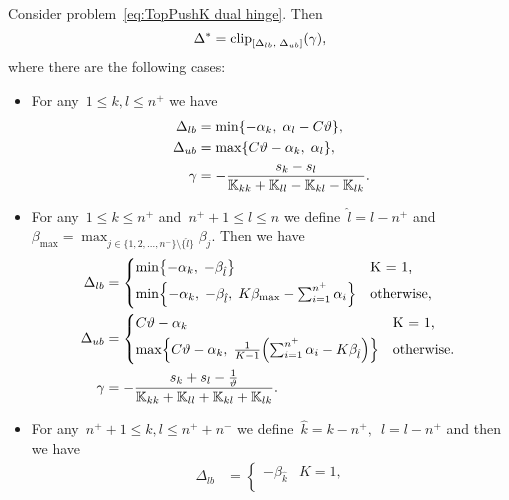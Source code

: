 \begin{theorem}\label{thm:Update rule TopPushK with hinge loss}
  Consider problem~\eqref{eq:TopPushK dual hinge}. Then
  \begin{equation*}
    \Delta^{*} = \clip{\Delta_{lb}}{\Delta_{ub}}{\gamma},
  \end{equation*}
  where there are the following cases:
  \begin{itemize}
    \item For any~$1\le k, l \le n^+$ we have
    \begin{align*}
      \Delta_{lb} & = \min\{- \alpha_k,\; \alpha_l - C \vartheta \}, \\
      \Delta_{ub} & = \max\{C \vartheta - \alpha_k,\; \alpha_l \}, \\
      \gamma      & = -\frac{s_k - s_l}{\mathbb{K}_{kk} + \mathbb{K}_{ll} - \mathbb{K}_{kl} - \mathbb{K}_{lk}}.
    \end{align*}
    \item For any~$1 \le k \le n^+$ and~$n^+ + 1 \le l \le n$ we define~$\hat{l} = l - n^+$ and~$\beta_{\max} = \max_{j \in \{1, 2, \ldots, n^- \} \setminus \{\hat l\}} \beta_j.$ Then we have
    \begin{align*}
      \Delta_{lb} & = 
        \begin{cases*}
          \min \Brac[c]{- \alpha_k,\;  -\beta_{\hat{l}}} & K = 1, \\
          \min \Brac[c]{- \alpha_k,\;  -\beta_{\hat{l}}, \; K\beta_{\max} - \sum_{i = 1}^{n^+} \alpha_i} & \textrm{otherwise},
        \end{cases*} \\
      \Delta_{ub} & = 
        \begin{cases*}
            C \vartheta - \alpha_k & K = 1, \\
            \max \Brac[c]{C \vartheta - \alpha_k, \; \frac{1}{K-1}\Brac{\sum_{i = 1}^{n^+} \alpha_i - K \beta_{\hat{l}}}}  & \textrm{otherwise}.
        \end{cases*} \\
      \gamma & = - \frac{s_k + s_l - \frac{1}{\vartheta}}{\K_{kk} + \K_{ll} + \K_{kl} + \K_{lk}}.
    \end{align*}
    \item For any~$n^+ + 1\le k,l \le n^+ + n^-$ we define~$\hat{k} = k - n^+,$~$\hat{l} = l - n^+$ and then we have
    \begin{align*}
      \Delta_{lb} & = 
        \begin{cases*}
          - \beta_{\hat{k}} & K = 1, \\

\end{cases*}
\end{align*}
\end{itemize}
\end{theorem}
